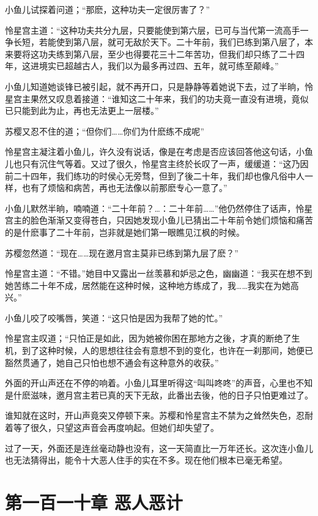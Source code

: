 \documentclass[12pt,oneside]{book}
\begin{document}
小鱼儿试探着问道；``那麽，这种功夫一定很厉害了？''

怜星宫主道：``这种功夫共分九层，只要能使到第六层，已可与当代第一流高手一争长短，若能使到第八层，就可无敌於天下。二十年前，我们已练到第八层了，本来要将这功夫练到第八层，至少也得要花三十二年苦功，但我们却只练了二十四年，这进境实已超越古人，我们以为最多再过四、五年，就可练至颠峰。''

小鱼儿知道她谈锋已被引起，就不再开口，只是静静等着她说下去，过了半晌，怜星宫主果然又叹息着接道：``谁知这二十年来，我们的功夫竟一直没有进境，竟似已只能到此为止，再也无法更上一层楼。''

苏樱又忍不住的道；``但你们\ldots\ldots 你们为什麽练不成呢''

怜星宫主凝注着小鱼儿，许久没有说话，像是在考虑是否应该回答他这句话，小鱼儿也只有沉住气等着。又过了很久，怜星宫主终於长叹了一声，缓缓道：``这乃因前二十四年，我们练功的时侯心无旁骛，但到了後二十年，我们却也像凡俗中人一样，也有了烦恼和病苦，再也无法像以前那麽专心一意了。''

小鱼儿默然半晌，喃喃道：``二十年前？\ldots：二十年前\ldots\ldots{}''他仍然停住了话声，怜星宫主的脸色渐渐又变得苍白，只因她发现小鱼儿已猜出二十年前令她们烦恼和痛苦的是什麽事了二十年前，岂非就是她们第一眼瞧见江枫的时候。

苏樱忽然道：``现在\ldots\ldots 现在邀月宫主莫非已练到第九层了麽？''

怜星宫主道：``不错。''她目中又露出一丝羡慕和妒忌之色，幽幽道：``我买在想不到她苦练二十年不成，居然能在这种时候，这种地方练成了，我\ldots\ldots 我实在为她高兴。''

小鱼儿咬了咬嘴唇，笑道：``这只怕是因为我帮了她的忙。''

怜星宫主叹道；``只怕正是如此，因为她被你困在那地方之後，才真的断绝了生机，到了这种时候，人的思想往往会有意想不到的变化，也许在一刹那间，她便已豁然贯通了，她自己只怕也想不通会有这种意外的收获。''

外面的开山声还在不停的响着。小鱼儿耳里听得这``叫叫咚咚''的声音，心里也不知是什麽滋味，邀月宫主若已真的天下无敌，此番出去後，他的日子只怕更难过了。

谁知就在这时，开山声竟突又停顿下来。苏樱和怜星宫主不禁为之耸然失色，忍耐着等了很久，只望这声音会再度响起。但她们却失望了。

过了一天，外面还是连丝毫动静也没有，这一天简直比一万年还长。这次连小鱼儿也无法猜得出，能令十大恶人住手的实在不多。现在他们根本已毫无希望。

\hypertarget{ux7b2cux4e00ux767eux4e00ux5341ux7ae0-ux6076ux4ebaux6076ux8ba1}{%
\chapter{第一百一十章
恶人恶计}\label{ux7b2cux4e00ux767eux4e00ux5341ux7ae0-ux6076ux4ebaux6076ux8ba1}}
\end{document}
